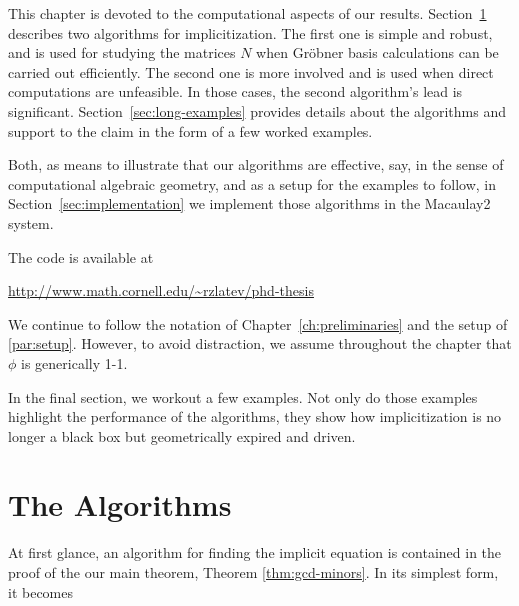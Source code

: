 \documentclass[fleqn,reqno]{amsart}
\begin{document}



\begin{paragraf*}
This chapter is devoted to the computational aspects of our results.
Section~\ref{sec:algorithms} describes two algorithms for implicitization.
The first one is simple and robust, and is used for studying the matrices $N$
when Gr\"obner basis calculations can be carried out efficiently.
The second one is more involved and is used when direct computations are unfeasible.
In those cases, the second algorithm's lead is significant.
Section~\ref{sec:long-examples} provides details about the algorithms
and support to the claim in the form of a few worked examples.
\end{paragraf*}

\begin{paragraf*}
Both, as means to illustrate that our algorithms are effective, say,
in the sense of computational algebraic geometry,
and as a setup for the examples to follow,
in Section~\ref{sec:implementation} we implement those algorithms in
the Macaulay2 system.
\end{paragraf*}

\begin{paragraf*}
The code is available at
\begin{center}
	\url{http://www.math.cornell.edu/~rzlatev/phd-thesis}
\end{center}
\end{paragraf*}

\begin{paragraf*}
We continue to follow the notation of Chapter~\ref{ch:preliminaries}
and the setup of \eqref{par:setup}.
However, to avoid distraction,
we assume throughout the chapter that $\phi$ is generically 1-1.
\end{paragraf*}

\begin{paragraf*}
In the final section, we workout a few examples.
Not only do those examples highlight the performance of the algorithms,
they show how implicitization is no longer a black box but geometrically
expired and driven.
\end{paragraf*}



\section{The Algorithms}
\label{sec:algorithms}

\begin{paragraf*}
At first glance, an algorithm for finding the implicit equation is contained in the proof
of the our main theorem, Theorem \ref{thm:gcd-minors}.
In its simplest form, it becomes
\end{paragraf*}
\end{document}
